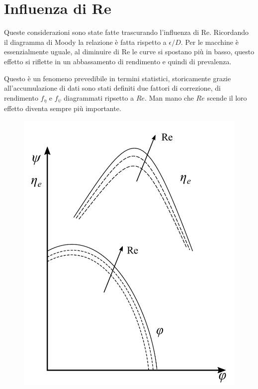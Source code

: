 \section{Influenza di Re}
Queste considerazioni sono state fatte trascurando l'influenza di Re. Ricordando il diagramma di Moody la relazione è fatta rispetto a $\epsilon/D$. Per le macchine è essenzialmente uguale, al diminuire di Re le curve si spostano più in basso, questo effetto si riflette in un abbassamento di rendimento e quindi di prevalenza.

Questo è un fenomeno prevedibile in termini statistici, storicamente grazie all'accumulazione di dati sono stati definiti due fattori di correzione, di rendimento $f_\eta$ e $f_\psi$ diagrammati ripsetto a $Re$. Man mano che $Re$ scende il loro effetto diventa sempre più importante. 
\begin{figure}
\centering
\begin{minipage}{.4\textwidth}
  \centering
  \includegraphics[width=.95\linewidth]{fig/secondo_1.pdf}
  \label{fig:secondo_1}
\end{minipage}%
\begin{minipage}{.6\textwidth}

\end{minipage}
\end{figure}
